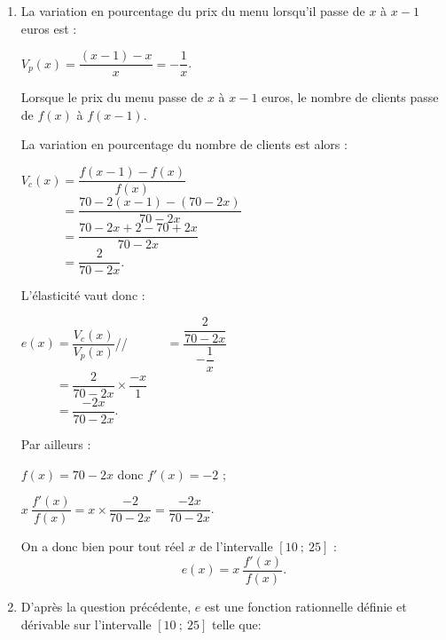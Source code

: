\begin{corrige}
\begin{enumerate}
{               Toutefois, la propriété employée ici (et vue en classe de Seconde) permet d'aboutir au résultat plus rapidement.
          }
          \item %
          La variation en pourcentage du prix du menu lorsqu'il passe de $x$ à $x-1$ euros est :
          \par
          $V_p(x)=\dfrac{(x-1)-x}{x}=-\dfrac{1}{x}$.
          \par
          Lorsque le prix du menu passe de $x$ à $x-1$ euros, le nombre de clients passe de $f(x)$ à $f(x-1)$.
          \par
          La variation en pourcentage du nombre de clients est alors :
          \par
          $V_c(x)=\dfrac{f(x-1)-f(x)}{f(x)}$\\
          $\phantom{V_c(x)}=\dfrac{70-2(x-1)-(70-2x)}{70-2x}$\\
          $\phantom{V_c(x)}=\dfrac{70-2x+2-70+2x}{70-2x}$\\
          $\phantom{V_c(x)}=\dfrac{2}{70-2x}.$
          \par
          L'élasticité vaut donc :
          \par
          $e(x)=\dfrac{V_c(x)}{V_p(x)}$//
          $\phantom{e(x)}=\dfrac{\dfrac{2}{70-2x}}{-\dfrac{1}{x}}$\\
          $\phantom{e(x)}=\dfrac{2}{70-2x} \times \dfrac{-x}{1}$\\
          $\phantom{e(x)}=\dfrac{-2x}{70-2x}.$
          \par
          \vspace{2mm}
          Par ailleurs :
          \par
          $f(x)=70-2x$ donc $f'(x)=-2$ ;
          \par
          $x\ \dfrac{f'(x)}{f(x)} = x \times \dfrac{-2}{70-2x}=\dfrac{-2x}{70-2x}$.
          \par
          On a donc bien pour tout réel $x$ de l'intervalle $[10~;~25]$ :
          \[ e(x)=x\ \dfrac{f'(x)}{f(x)}. \]
          \item
          D'après la question précédente, $e$ est une fonction rationnelle définie et dérivable sur l'intervalle $[10~;~25]$ telle que:

\end{enumerate}
\end{corrige}
